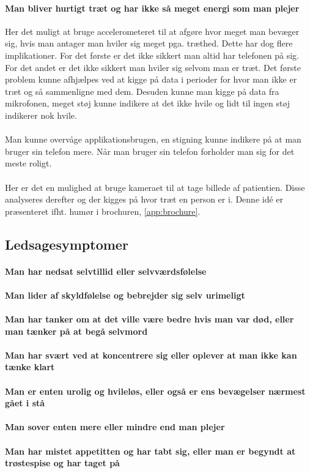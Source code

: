 \paragraph{Man bliver hurtigt træt og har ikke så meget energi som man plejer}
Her det muligt at bruge accelerometeret til at afgøre hvor meget man bevæger sig, hvis man antager man hviler sig meget pga. træthed. Dette har dog flere implikationer. For det første er det ikke sikkert man altid har telefonen på sig. For det andet er det ikke sikkert man hviler sig selvom man er træt.
Det første problem kunne afhjælpes ved at kigge på data i perioder for hvor man ikke er træt og så sammenligne med dem.
Desuden kunne man kigge på data fra mikrofonen, meget støj kunne indikere at det ikke hvile og lidt til ingen støj indikerer nok hvile.
\\
\\
Man kunne overvåge applikationsbrugen, en stigning kunne indikere på at man bruger sin telefon mere. Når man bruger sin telefon forholder man sig for det meste roligt.
\\
\\
Her er det en mulighed at bruge kameraet til at tage billede af patientien. Disse analyseres derefter og der kigges på hvor træt en person er i. Denne idé er præsenteret ifht. humør i brochuren, \cref{app:brochure}.

\subsection{Ledsagesymptomer}
\paragraph{Man har nedsat selvtillid eller selvværdsfølelse}
\paragraph{Man lider af skyldfølelse og bebrejder sig selv urimeligt}
\paragraph{Man har tanker om at det ville være bedre hvis man var død, eller man tænker på at begå selvmord}
\paragraph{Man har svært ved at koncentrere sig eller oplever at man ikke kan tænke klart}
\paragraph{Man er enten urolig og hvileløs, eller også er ens bevægelser nærmest gået i stå}
\paragraph{Man sover enten mere eller mindre end man plejer}
\paragraph{Man har mistet appetitten og har tabt sig, eller man er begyndt at trøstespise og har taget på}
